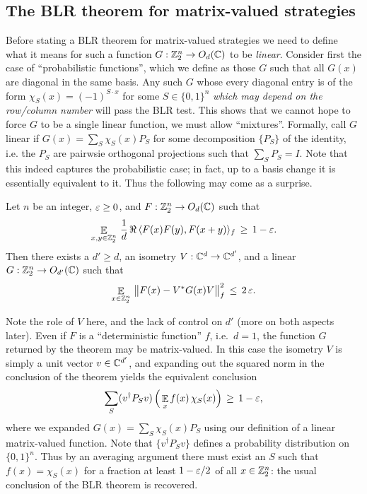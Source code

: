 \subsection{The BLR theorem for matrix-valued strategies}

Before stating a BLR theorem for matrix-valued strategies we need to define what it means for such a function $G: \mathbb{Z}_2^n \to O_d(\mathbb{C})$ to be \emph{linear}. Consider first the case of ``probabilistic functions'', which we define as those $G$ such that all $G(x)$ are diagonal in the same basis. Any such $G$ whose every diagonal entry is of the form $\chi_{S}(x) = (-1)^{S \cdot x}$ for some $S\in\{0,1\}^n$ \emph{which may depend on the row/column number} will pass the BLR test. This shows that we cannot hope to force $G$ to be a single linear function, we must allow ``mixtures''. Formally, call $G$ linear if $G(x) = \sum_S \chi_S(x) P_S$ for some decomposition $\{P_S\}$ of the identity, i.e. the $P_S$ are pairwsie orthogonal projections such that $\sum_S P_S=I$. Note that this indeed captures the probabilistic case; in fact, up to a basis change it is essentially equivalent to it. Thus the following may come as a surprise.  

\begin{theorem}\label{theorem-blr}
Let $n$ be an integer, $\varepsilon\geq 0$, and $F:\mathbb{Z}_2^n \to O_d(\mathbb{C})$ such that
\begin{equation}\label{eq:approx-linear}
\mathop{\mathbb{E}}\displaylimits_{x,y\in \mathbb{Z}_2^n} \, \frac{1}{d}\,\Re\,\langle F(x)F(y),F(x+y)\rangle_f \,\geq\, 1-\varepsilon.
\end{equation}
 Then there exists a $d'\geq d$, an isometry $V:\mathbb{C}^d\to\mathbb{C}^{d'}$, and a linear $G:\mathbb{Z}_2^n \to O_{d'}(\mathbb{C})$ such that 
$$\mathop{\mathbb{E}}\displaylimits_{x\in\mathbb{Z}_2^n} \,\big\| F(x) - V^* G(x)V\big\|_f^2 \,\leq\, 2\,\varepsilon.$$
\end{theorem}

Note the role of $V$ here, and the lack of control on $d'$ (more on both aspects later). Even if $F$ is a ``deterministic function'' $f$, i.e.\ $d=1$, the function $G$ returned by the theorem may be matrix-valued. In this case the isometry $V$ is simply a unit vector $v\in \mathbb{C}^{d'}$, and expanding out the squared norm in the conclusion of the theorem yields the equivalent conclusion 
$$\sum_S (v^\dagger P_S v)\,\Big(\mathop{\mathbb{E}}\displaylimits_{x}  f(x)\, \chi_S(x) \Big)  \,\geq\, 1-\varepsilon,$$ 
where we expanded $G(x) = \sum_S \chi_S(x) P_S$ using our definition of a linear matrix-valued function. Note that $\{ v^\dagger P_S v\}$ defines a probability distribution on $\{0,1\}^n$. Thus by an averaging argument there must exist an $S$ such that $f(x)=\chi_S(x)$ for a fraction at least $1-\varepsilon/2$ of all $x\in\mathbb{Z}_2^n$: the usual conclusion of the BLR theorem is recovered. 

